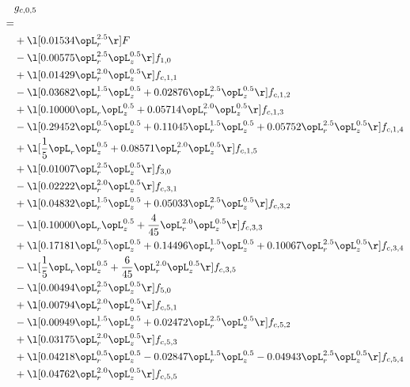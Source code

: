 \begin{alignat}{2} 
\label{eq:g_05_0} 
& g_{c,0,5} \nonumber \\ 
 = \\ 
& + \l[  0.01534 \opL_r^{2.5}  \r] F \nonumber \\ 
& - \l[  0.00575 \opL_r^{2.5} \opL_z^{0.5}  \r] f_{1,0} \nonumber \\ 
& + \l[  0.01429 \opL_r^{2.0} \opL_z^{0.5}  \r] f_{c,1,1} \nonumber \\ 
& - \l[  0.03682 \opL_r^{1.5} \opL_z^{0.5} +  0.02876 \opL_r^{2.5} \opL_z^{0.5}  \r] f_{c,1,2} \nonumber \\ 
& + \l[  0.10000 \opL_r \opL_z^{0.5} +  0.05714 \opL_r^{2.0} \opL_z^{0.5}  \r] f_{c,1,3} \nonumber \\ 
& - \l[  0.29452 \opL_r^{0.5} \opL_z^{0.5} +  0.11045 \opL_r^{1.5} \opL_z^{0.5} +  0.05752 \opL_r^{2.5} \opL_z^{0.5}  \r] f_{c,1,4} \nonumber \\ 
& + \l[ \frac{1}{5} \opL_r \opL_z^{0.5} +  0.08571 \opL_r^{2.0} \opL_z^{0.5}  \r] f_{c,1,5} \nonumber \\ 
& + \l[  0.01007 \opL_r^{2.5} \opL_z^{0.5}  \r] f_{3,0} \nonumber \\ 
& - \l[  0.02222 \opL_r^{2.0} \opL_z^{0.5}  \r] f_{c,3,1} \nonumber \\ 
& + \l[  0.04832 \opL_r^{1.5} \opL_z^{0.5} +  0.05033 \opL_r^{2.5} \opL_z^{0.5}  \r] f_{c,3,2} \nonumber \\ 
& - \l[  0.10000 \opL_r \opL_z^{0.5} + \frac{4}{45} \opL_r^{2.0} \opL_z^{0.5}  \r] f_{c,3,3} \nonumber \\ 
& + \l[  0.17181 \opL_r^{0.5} \opL_z^{0.5} +  0.14496 \opL_r^{1.5} \opL_z^{0.5} +  0.10067 \opL_r^{2.5} \opL_z^{0.5}  \r] f_{c,3,4} \nonumber \\ 
& - \l[ \frac{1}{5} \opL_r \opL_z^{0.5} + \frac{6}{45} \opL_r^{2.0} \opL_z^{0.5}  \r] f_{c,3,5} \nonumber \\ 
& - \l[  0.00494 \opL_r^{2.5} \opL_z^{0.5}  \r] f_{5,0} \nonumber \\ 
& + \l[  0.00794 \opL_r^{2.0} \opL_z^{0.5}  \r] f_{c,5,1} \nonumber \\ 
& - \l[  0.00949 \opL_r^{1.5} \opL_z^{0.5} +  0.02472 \opL_r^{2.5} \opL_z^{0.5}  \r] f_{c,5,2} \nonumber \\ 
& + \l[  0.03175 \opL_r^{2.0} \opL_z^{0.5}  \r] f_{c,5,3} \nonumber \\ 
& + \l[  0.04218 \opL_r^{0.5} \opL_z^{0.5}   -0.02847 \opL_r^{1.5} \opL_z^{0.5}   -0.04943 \opL_r^{2.5} \opL_z^{0.5}  \r] f_{c,5,4} \nonumber \\ 
& + \l[  0.04762 \opL_r^{2.0} \opL_z^{0.5}  \r] f_{c,5,5} \nonumber \\ 
\end{alignat} 



